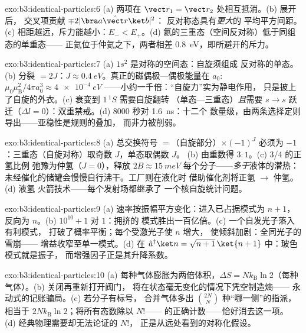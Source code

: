 \begin{solution}{exo:b3:identical-particles:6}
(a) 两项在 $\vect r_1 = \vect r_2$ 处相互抵消。(b) 展开后，
交叉项贡献 $\mp2|\bra a\hat{\vect r}\ket b|^2$：
反对称态具有\emph{更大}的
平均平方间距。(c) 相距越远，斥力能越小：$E_- <
E_+$。(d) 氦的三重态（空间反对称）低于同组态的单重态——
正氦位于仲氦之下，两者相差
\qty{0.8}{eV}，即所避开的斥力。
\end{solution}

\begin{solution}{exo:b3:identical-particles:7}
(a) $1s^2$ 是对称的空间态：自旋须组成
反对称的单态。(b) 分裂 $= 2J$：$J \approx
\qty{0.4}{eV}$。真正的磁偶极—偶极能量在
$a_0$: $\mu_0\mu_{\text{B}}^2/4\pi a_0^3 \approx \qty{4e-4}{eV}$
——小约一千倍：“自旋力”实为静电作用，
只是披上了自旋的外衣。(c) 衰变到 $1\,^1S$ 需要自旋翻转
（单态—三重态）\emph{且}需要 $s \to s$ 跃迁（$\Delta l =
0$）：双重禁戒。(d) $8000$ 秒对 \qty{1.6}{ns}：十二个
数量级，由两条选择定则导出——亚稳性是规则的叠加，
而非力被削弱。
\end{solution}

\begin{solution}{exo:b3:identical-particles:8}
(a) 总交换符号 $=$（自旋部分）$\times (-1)^J$ 必须为
$-1$：三重态（自旋对称）取奇数 $J$，单态取偶数 $J$。
(b) 由重数得 $3:1$。(c) 3/4 的正氢比例
弛豫为仲氢（$J = 0$），释放 $2B \approx \qty{15}{meV}$
每个分子——\emph{多于}液体的潜热：
未经催化的储罐会慢慢自行沸干。工厂则在液化时
借助催化剂将正氢 $\to$ 仲氢。(d) 液氢
火箭技术——每个发射场都继承了
一个核自旋统计问题。
\end{solution}

\begin{solution}{exo:b3:identical-particles:9}
(a) 速率按振幅平方变化：进入已占据模式为 $n + 1$，
反向为 $n$。(b) $10^{10} + 1$ 对 $1$：拥挤的
模式胜出一百亿倍。(c) 一个自发光子落入有利模式，
打破了概率平衡；每个受激光子使 $n$ 增大，
使倾斜加剧：全同光子的雪崩——
增益收窄至单一模式。(d) 在 $\hat a^\dagger\ket n =
\sqrt{n+1}\,\ket{n+1}$ 中：玻色模式就是振子，
而增强因子正是其升降系数。
\end{solution}

\begin{solution}{exo:b3:identical-particles:10}
(a) 每种气体膨胀为两倍体积，$\Delta S =
Nk_{\text{B}}\ln2$（每种气体）。(b) 关闭再重新打开阀门，
将在状态毫无变化的情况下凭空制造熵——
永动式的记账骗局。(c) 若分子有标号，
合并气体多出 $\binom{2N}{N}$ 种“哪一侧”的指派，
相当于 $2Nk_{\text{B}}\ln2$；将所有态数除以 $N!$——
的正确计数——恰好消去这一项。
(d) 经典物理需要却无法论证的 $N!$，
正是从远处看到的对称化假设。
\end{solution}

